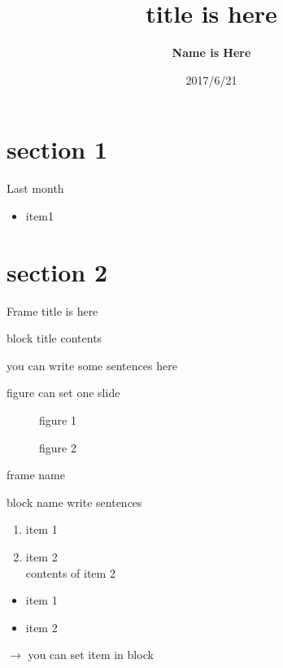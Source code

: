 \documentclass[11pt,xcolor=dvipsnames,table,dvipdfmx]{beamer}
\title{title is here}
\author{\textbf{Name is Here}}
\date{2017/6/21}
\institute{github.com}
\begin{document}
\maketitle

\section{section 1}
\begin{frame}{Last month}
 \begin{itemize}
  \item item1
 \end{itemize}
\end{frame}

\section{section 2}
\begin{frame}{Frame title is here}
 \begin{block}{block title}
  contents
 \end{block}
 you can write some sentences here
\end{frame}

\begin{frame}{figure can set one slide}
 \begin{figure}
  \caption{figure 1}
  \centering
 \end{figure}
 \begin{figure}
  \caption{figure 2}
  \centering
 \end{figure}
\end{frame}


\begin{frame}{frame name}
 \begin{block}{block name}
  write sentences
  \begin{enumerate}
   \item item 1 \\
   \item item 2 \\
         contents of item 2
  \end{enumerate}
 \end{block}
 \begin{itemize}
  \item item 1 \\
  \item item 2 \\
 \end{itemize}
 $\rightarrow$ you can set item in block
\end{frame}
\end{document}
